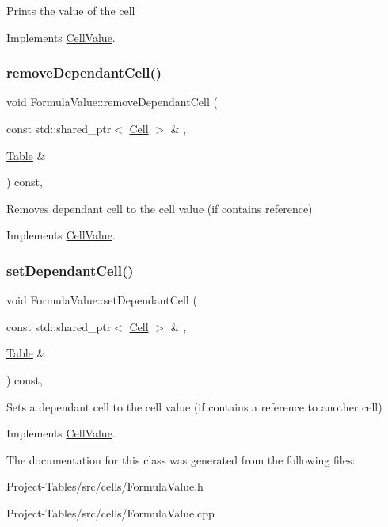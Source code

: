 Prints the value of the cell 

Implements \hyperlink{classCellValue_a12d1cf68a5ba83f0c375441729772742}{Cell\+Value}.

\mbox{\label{classFormulaValue_a7081172a6793644e3375c81f76ed1ba8}} 
\subsubsection{\texorpdfstring{remove\+Dependant\+Cell()}{removeDependantCell()}}
{\footnotesize\ttfamily void Formula\+Value\+::remove\+Dependant\+Cell (\begin{DoxyParamCaption}\item[{const std\+::shared\+\_\+ptr$<$ \hyperlink{classCell}{Cell} $>$ \&}]{,  }\item[{\hyperlink{classTable}{Table} \&}]{ }\end{DoxyParamCaption}) const\hspace{0.3cm}{\ttfamily [override]}, {\ttfamily [virtual]}}

Removes dependant cell to the cell value (if contains reference) 

Implements \hyperlink{classCellValue_a72b4390db6c53e525550cefade66fb0e}{Cell\+Value}.

\mbox{\label{classFormulaValue_a0532fb20f1ea829fd8ec7fa32c96105a}} 
\subsubsection{\texorpdfstring{set\+Dependant\+Cell()}{setDependantCell()}}
{\footnotesize\ttfamily void Formula\+Value\+::set\+Dependant\+Cell (\begin{DoxyParamCaption}\item[{const std\+::shared\+\_\+ptr$<$ \hyperlink{classCell}{Cell} $>$ \&}]{,  }\item[{\hyperlink{classTable}{Table} \&}]{ }\end{DoxyParamCaption}) const\hspace{0.3cm}{\ttfamily [override]}, {\ttfamily [virtual]}}

Sets a dependant cell to the cell value (if contains a reference to another cell) 

Implements \hyperlink{classCellValue_ad2437fb3d4d4a96d9a76c857b3d04231}{Cell\+Value}.



The documentation for this class was generated from the following files\+:\begin{DoxyCompactItemize}
\item 
Project-\/\+Tables/src/cells/Formula\+Value.\+h\item 
Project-\/\+Tables/src/cells/Formula\+Value.\+cpp\end{DoxyCompactItemize}
